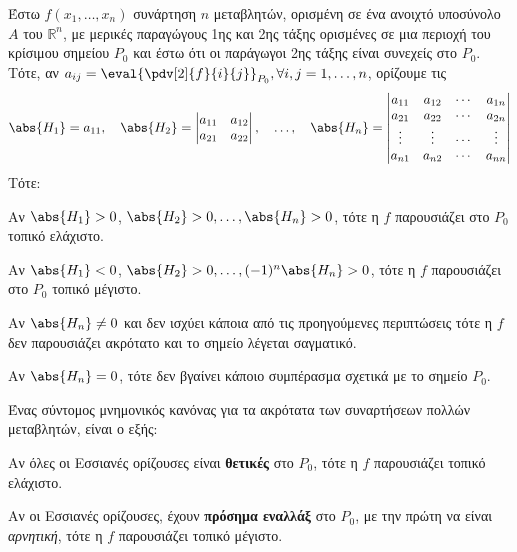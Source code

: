 \documentclass[a4paper,table]{report}
\begin{document}
\begin{mybox2}
\begin{thm}
  Έστω $ f(x_{1},\ldots, x_{n}) $ συνάρτηση $n$ μεταβλητών, ορισμένη σε ένα ανοιχτό 
  υποσύνολο $A$ του $ \mathbb{R}^{n} $, με μερικές παραγώγους 1ης και 2ης τάξης 
  ορισμένες σε μια  περιοχή του κρίσιμου σημείου $P_{0}$ και έστω ότι οι παράγωγοι 
  2ης τάξης είναι συνεχείς στο $P_{0}$. Τότε, αν $ a_{ij} =
  \eval{\pdv[2]{f}{i}{j}}_{P_{0}}, 
  \forall i,j = 1,\ldots, n$, ορίζουμε τις 
  \[
    \abs{H_{1}} = a_{11}, \quad 
    \abs{H_{2}} = 
    \begin{vmatrix}
      a_{11} & a_{12} \\
      a_{21} & a_{22}
    \end{vmatrix}, \quad \ldots, \quad 
    \abs{H_{n}} = 
    \begin{vmatrix}
      a_{11} & a_{12} & \cdots & a_{1n} \\
      a_{21} & a_{22} & \cdots & a_{2n} \\
      \vdots & \vdots & \cdots & \vdots \\
      a_{n1} & a_{n2} & \cdots & a_{nn} \\
    \end{vmatrix} 
  \]
  Τότε:

  \begin{myitemize}
    \item Αν $ \abs{H_{1}} >0 $, $ \abs{H_{2}} >0, \ldots, \abs{H_{n}} > 0 $, 
      τότε η $f$ παρουσιάζει στο $ P_{0} $ τοπικό ελάχιστο.
    \item Αν $ \abs{H_{1}} <0 $, $ \abs{H_{2}} >0, \ldots, 
      (-1)^{n}\abs{H_{n}} > 0 $, τότε η $f$ παρουσιάζει στο $ P_{0} $ τοπικό 
      μέγιστο.
    \item Αν $ \abs{H_{n}} \neq 0 $ και δεν ισχύει 
      κάποια από τις προηγούμενες περιπτώσεις τότε η $f$ δεν παρουσιάζει 
      ακρότατο και το σημείο λέγεται σαγματικό.
    \item Αν $ \abs{H_{n}} = 0$, τότε δεν βγαίνει κάποιο συμπέρασμα σχετικά με το 
      σημείο $P_{0} $.
  \end{myitemize}
\end{thm}
\end{mybox2}

\begin{rem}
  Ένας σύντομος μνημονικός κανόνας για τα ακρότατα των συναρτήσεων πολλών μεταβλητών, 
  είναι ο εξής:
  \begin{myitemize}
    \item Αν όλες οι Εσσιανές ορίζουσες είναι \textbf{θετικές} στο $ P_{0} $, τότε η 
      $f$ παρουσιάζει τοπικό ελάχιστο.
    \item Αν οι Εσσιανές ορίζουσες, έχουν \textbf{πρόσημα εναλλάξ} στο $ P_{0} $, με 
      την πρώτη να είναι \textit{αρνητική}, τότε η $f$ παρουσιάζει τοπικό μέγιστο.
  \end{myitemize}
\end{rem}
\end{document}
